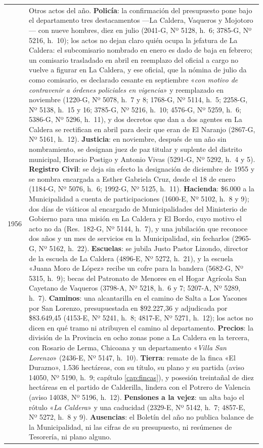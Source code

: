 \begin{longtable}{@{}p{2.7cm}p{10.3cm}@{}}
1956 & Otros actos del año. \textbf{Policía}: la confirmación del presupuesto pone bajo el departamento tres destacamentos ---La Caldera, Vaqueros y Mojotoro--- con nueve hombres, diez en julio (2041-G, Nº 5128, h.\ 6; 3785-G, Nº 5216, h.\ 10); los actos no dejan claro quién ocupa la jefatura de La Caldera: el subcomisario nombrado en enero es dado de baja en febrero; un comisario trasladado en abril en reemplazo del oficial a cargo no vuelve a figurar en La Caldera, y ese oficial, que la nómina de julio da como comisario, es declarado cesante en septiembre «\textit{con motivo de contravenir a órdenes policiales en vigencia}» y reemplazado en noviembre (1220-G, Nº 5078, h.\ 7 y 8; 1768-G, Nº 5114, h.\ 5; 2258-G, Nº 5138, h.\ 15 y 16; 3785-G, Nº 5216, h.\ 10; 4576-G, Nº 5259, h.\ 6; 5386-G, Nº 5296, h.\ 11), y dos decretos que dan a dos agentes en La Caldera se rectifican en abril para decir que eran de El Naranjo (2867-G, Nº 5161, h.\ 12). \textbf{Justicia}: en noviembre, después de un año sin nombramiento, se designan juez de paz titular y suplente del distrito municipal, Horacio Postigo y Antonio Vivas (5291-G, Nº 5292, h.\ 4 y 5). \textbf{Registro Civil}: se deja sin efecto la designación de diciembre de 1955 y se nombra encargada a Esther Gabriela Cruz, desde el 18 de enero (1184-G, Nº 5076, h.\ 6; 1992-G, Nº 5125, h.\ 11). \textbf{Hacienda}: \$6.000 a la Municipalidad a cuenta de participaciones (1600-E, Nº 5102, h.\ 8 y 9); dos días de viáticos al encargado de Municipalidades del Ministerio de Gobierno para una misión en La Caldera y El Bordo, cuyo motivo el acto no da (Res.\ 182-G, Nº 5144, h.\ 7), y una jubilación que reconoce dos años y un mes de servicios en la Municipalidad, sin fecharlos (2965-G, Nº 5162, h.\ 22). \textbf{Escuelas}: se jubila Justo Pastor Lizondo, director de la escuela de La Caldera (4896-E, Nº 5272, h.\ 21), y la escuela «Juana Moro de López» recibe un cofre para la bandera (5682-G, Nº 5315, h.\ 9); becas del Patronato de Menores en el Hogar Agrícola San Cayetano de Vaqueros (3798-A, Nº 5218, h.\ 6 y 7; 5207-A, Nº 5289, h.\ 7). \textbf{Caminos}: una alcantarilla en el camino de Salta a Los Yacones por San Lorenzo, presupuestada en \$92.227,36 y adjudicada por \$83.649,45 (4153-E, Nº 5241, h.\ 8; 4817-E, Nº 5271, h.\ 12); los actos no dicen en qué tramo ni atribuyen el camino al departamento. \textbf{Precios}: la división de la Provincia en ocho zonas pone a La Caldera en la tercera, con Rosario de Lerma, Chicoana y un departamento «\textit{Villa San Lorenzo}» (2436-E, Nº 5147, h.\ 10). \textbf{Tierra}: remate de la finca «El Durazno», 1.536 hectáreas, con su título, su plano y su partida (aviso 14050, Nº 5190, h.\ 9; capítulo \ref{cap:fincas}), y posesión treintañal de diez hectáreas en el partido de Calderilla, lindera con el Potrero de Valencia (aviso 14038, Nº 5196, h.\ 12). \textbf{Pensiones a la vejez}: un alta bajo el rótulo «\textit{La Caldera}» y una caducidad (2329-E, Nº 5142, h.\ 7; 4857-E, Nº 5272, h.\ 8 y 9). \textbf{Ausencias}: el Boletín del año no publica balance de la Municipalidad, ni las cifras de su presupuesto, ni resúmenes de Tesorería, ni plano alguno. \\

\end{longtable}

